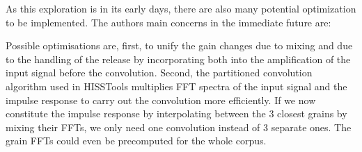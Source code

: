 As this exploration is in its early days, there are also many potential optimization to be implemented. The authors main concerns in the immediate future are:

Possible optimisations are, first, to unify the gain changes due to mixing and due to the handling of the release by incorporating both into the amplification of the input signal before the convolution.
Second, the partitioned convolution algorithm used in HISSTools multiplies FFT spectra of the input signal and the impulse response to carry out the convolution more efficiently.  If we now constitute the impulse response by interpolating between the 3 closest grains by mixing their FFTs, we only need one convolution instead of 3 separate ones.  The grain FFTs could even be precomputed for the whole corpus. %
